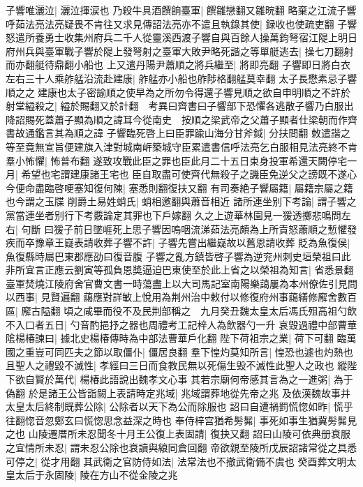 子響唯灑泣|{
	灑泣揮涙也}
乃殺牛具酒饌餉臺軍|{
	饌雛戀翻又雛晥翻}
略棄之江流子響呼茹法亮法亮疑畏不肯往又求見傳詔法亮亦不遣且執錄其使|{
	録收也使疏吏翻}
子響怒遣所養勇士收集州府兵二千人從靈溪西渡子響自與百餘人操萬鈞弩宿江隄上明日府州兵與臺軍戰子響於隄上發弩射之臺軍大敗尹略死諧之等單艇逃去|{
	操七刀翻射而亦翻艇待鼎翻小船也}
上又遣丹陽尹蕭順之將兵繼至|{
	將即亮翻}
子響即日將白衣左右三十人乘舴艋沿流赴建康|{
	舴艋亦小船也舴陟格翻艋莫幸翻}
太子長懋素忌子響順之之建康也太子密諭順之使早為之所勿令得還子響見順之欲自申明順之不許於射堂縊殺之|{
	縊於賜翻又於計翻　考異曰齊書曰子響部下恐懼各逃散子響乃白服出降詔賜死蓋蕭子顯為順之諱耳今從南史　按順之梁武帝之父蕭子顯者仕梁朝而作齊書故通鑑言其為順之諱}
子響臨死啓上曰臣罪踰山海分甘斧鉞|{
	分扶問翻}
敇遣諧之等至竟無宣旨便建旗入津對城南㟁築城守臣累遣書信呼法亮乞白服相見法亮終不肯羣小怖懼|{
	怖普布翻}
遂致攻戰此臣之罪也臣此月二十五日束身投軍希還天闕停宅一月|{
	希望也宅謂建康諸王宅也}
臣自取盡可使齊代無殺子之譏臣免逆父之謗既不遂心今便命盡臨啓哽塞知復何陳|{
	塞悉則翻復扶又翻}
有司奏絶子響屬籍|{
	屬籍宗屬之籍也今謂之玉牒}
削爵土易姓蛸氏|{
	蛸相邀翻與蕭音相近}
諸所連坐别下考論|{
	謂子響之黨當連坐者别行下考覈論定其罪也下戶嫁翻}
久之上遊華林園見一猨透擲悲鳴問左右|{
	句斷}
曰猨子前日墜崕死上思子響因嗚咽流涕茹法亮頗為上所責怒蕭順之慙懼發疾而卒豫章王嶷表請收葬子響不許|{
	子響先嘗出繼嶷故以舊恩請收葬}
貶為魚復侯|{
	魚復縣時屬巴東郡應劭曰復音腹}
子響之亂方鎮皆啓子響為逆兖州刺史垣榮祖曰此非所宜言正應云劉寅等孤負恩奬逼迫巴東使至於此上省之以榮祖為知言|{
	省悉景翻}
臺軍焚燒江陵府舍官曹文書一時蕩盡上以大司馬記室南陽樂藹屢為本州僚佐引見問以西事|{
	見賢遍翻}
藹應對詳敏上悅用為荆州治中敕付以修復府州事藹繕修廨舍數百區|{
	廨古隘翻}
頃之咸畢而役不及民荆部稱之　九月癸丑魏太皇太后馮氏殂高祖勺飲不入口者五日|{
	勺音酌挹抒之器也周禮考工記梓人為飲器勺一升}
哀毀過禮中部曹華隂楊椿諫曰|{
	據北史楊椿傳時為中部法曹華戶化翻}
陛下荷祖宗之業|{
	荷下可翻}
臨萬國之重豈可同匹夫之節以取僵仆|{
	僵居良翻}
羣下惶灼莫知所言|{
	惶恐也遽也灼熱也}
且聖人之禮毀不滅性|{
	孝經曰三日而食教民無以死傷生毁不滅性此聖人之政也}
縱陛下欲自賢於萬代|{
	楊椿此語說出魏孝文心事}
其若宗廟何帝感其言為之一進粥|{
	為于偽翻}
於是諸王公皆詣闕上表請時定兆域|{
	兆域謂葬地從先帝之兆}
及依漢魏故事并太皇太后終制既葬公除|{
	公除者以天下為公而除服也}
詔曰自遭禍罰慌惚如昨|{
	慌乎往翻惚音忽鄭玄曰慌惚思念益深之時也}
奉侍梓宫猶希髣髴|{
	事死如事生猶冀髣髴見之也}
山陵遷厝所未忍聞冬十月王公復上表固請|{
	復抉又翻}
詔曰山陵可依典册衰服之宜情所未忍|{
	謂未忍公除也衰讀與縗同倉回翻}
帝欲親至陵所戊辰詔諸常從之具悉可停之|{
	從才用翻}
其武衛之官防侍如法|{
	法常法也不撤武衛備不虞也}
癸酉葬文明太皇太后于永固陵|{
	陵在方山不從金陵之兆}
